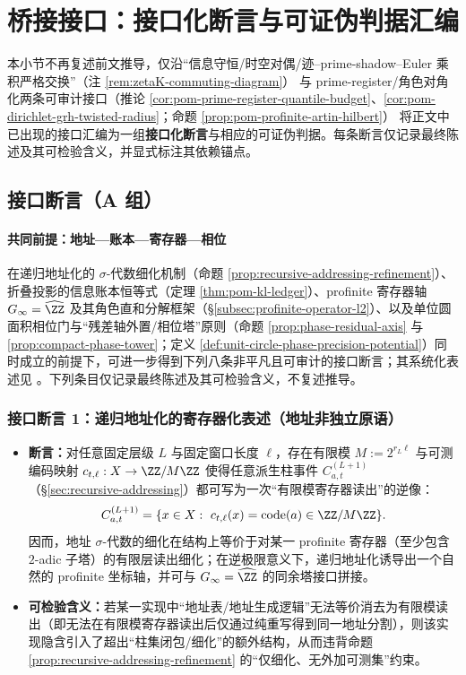 \section{桥接接口：接口化断言与可证伪判据汇编}\label{app:bridgepack}\label{subsec:bridgepack-unified-terminal}
本小节不再复述前文推导，仅沿“信息守恒/时空对偶/迹--prime-shadow--Euler 乘积严格交换”（注 \ref{rem:zetaK-commuting-diagram}）
与 prime-register/角色对角化两条可审计接口（推论 \ref{cor:pom-prime-register-quantile-budget}、\ref{cor:pom-dirichlet-grh-twisted-radius}；命题 \ref{prop:pom-profinite-artin-hilbert}）
将正文中已出现的接口汇编为一组\textbf{接口化断言}与相应的可证伪判据。每条断言仅记录最终陈述及其可检验含义，并显式标注其依赖锚点。

\subsection{接口断言（A 组）}\label{subsec:bridgepack-assertions}
\paragraph{共同前提：地址—账本—寄存器—相位}
在递归地址化的 \(\sigma\)-代数细化机制（命题 \ref{prop:recursive-addressing-refinement}）、折叠投影的信息账本恒等式（定理 \ref{thm:pom-kl-ledger}）、profinite 寄存器轴 \(G_\infty=\widehat{\ZZ}\) 及其角色直和分解框架（\S\ref{subsec:profinite-operator-l2}）、以及单位圆面积相位门与“残差轴外置/相位塔”原则（命题 \ref{prop:phase-residual-axis} 与 \ref{prop:compact-phase-tower}；定义 \ref{def:unit-circle-phase-precision-potential}）同时成立的前提下，可进一步得到下列八条非平凡且可审计的接口断言；其系统化表述见 \cite{Internal2026POMGenerativeAddressThreeRegisterBridgeRH}。下列条目仅记录最终陈述及其可检验含义，不复述推导。

\subsubsection{接口断言 1：递归地址化的寄存器化表述（地址非独立原语）}\label{app:bridgepack-assertion-1}
\begin{itemize}
  \item \textbf{断言：}对任意固定层级 \(L\) 与固定窗口长度 \(\ell\)，存在有限模 \(M:=2^{r_L\ell}\) 与可测编码映射 \(c_{t,\ell}:X\to \ZZ/M\ZZ\) 使得任意派生柱事件 \(C^{(L+1)}_{a,t}\)（\S\ref{sec:recursive-addressing}）都可写为一次“有限模寄存器读出”的逆像：
  \[
  C^{(L+1)}_{a,t}=\{x\in X:\ c_{t,\ell}(x)=\mathrm{code}(a)\in\ZZ/M\ZZ\}.
  \]
  因而，地址 \(\sigma\)-代数的细化在结构上等价于对某一 profinite 寄存器（至少包含 \(2\)-adic 子塔）的有限层读出细化；在逆极限意义下，递归地址化诱导出一个自然的 profinite 坐标轴，并可与 \(G_\infty=\widehat{\ZZ}\) 的同余塔接口拼接。
  \item \textbf{可检验含义：}若某一实现中“地址表/地址生成逻辑”无法等价消去为有限模读出（即无法在有限模寄存器读出后仅通过纯重写得到同一地址分割），则该实现隐含引入了超出“柱集闭包/细化”的额外结构，从而违背命题 \ref{prop:recursive-addressing-refinement} 的“仅细化、无外加可测集”约束。
\end{itemize}

